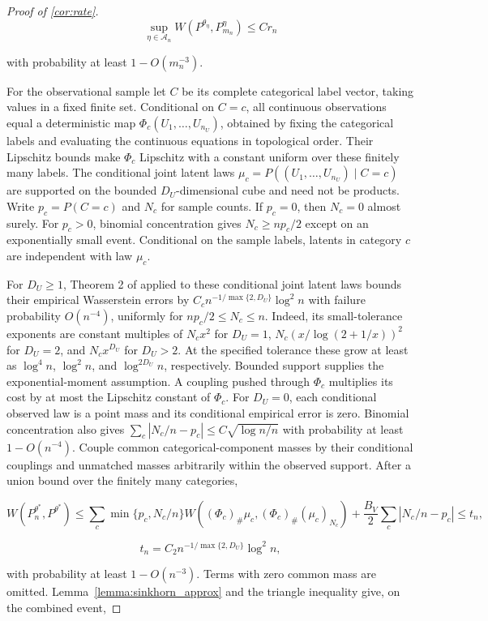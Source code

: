 \begin{proof}[Proof of \cref{cor:rate}]
\[
\sup_{\eta\in\mathcal A_n}W(P^{\theta_\eta},P_{m_n}^\eta)\leqslant Cr_n
\]

with probability at least $1-O(m_n^{-3})$. 

For the observational sample let $C$ be its complete categorical label vector, taking values in a fixed finite set. Conditional on $C=c$, all continuous observations equal a deterministic map $\Phi_c(U_1,\ldots,U_{n_U})$, obtained by fixing the categorical labels and evaluating the continuous equations in topological order. Their Lipschitz bounds make $\Phi_c$ Lipschitz with a constant uniform over these finitely many labels. The conditional joint latent laws $\mu_c=P((U_1,\ldots,U_{n_U})\mid C=c)$ are supported on the bounded $D_U$-dimensional cube and need not be products. Write $p_c=P(C=c)$ and $N_c$ for sample counts. If $p_c=0$, then $N_c=0$ almost surely. For $p_c>0$, binomial concentration gives $N_c\geqslant np_c/2$ except on an exponentially small event. Conditional on the sample labels, latents in category $c$ are independent with law $\mu_c$. 

For $D_U\geqslant1$, Theorem 2 of \cite{fournier2015rate} applied to these conditional joint latent laws bounds their empirical Wasserstein errors by $C_cn^{-1/\max\{2,D_U\}}\log^2n$ with failure probability $O(n^{-4})$, uniformly for $np_c/2\leqslant N_c\leqslant n$. Indeed, its small-tolerance exponents are constant multiples of $N_cx^2$ for $D_U=1$, $N_c(x/\log(2+1/x))^2$ for $D_U=2$, and $N_cx^{D_U}$ for $D_U>2$. At the specified tolerance these grow at least as $\log^4n$, $\log^2n$, and $\log^{2D_U}n$, respectively. Bounded support supplies the exponential-moment assumption. A coupling pushed through $\Phi_c$ multiplies its cost by at most the Lipschitz constant of $\Phi_c$. For $D_U=0$, each conditional observed law is a point mass and its conditional empirical error is zero. Binomial concentration also gives $\sum_c|N_c/n-p_c|\leqslant C\sqrt{\log n/n}$ with probability at least $1-O(n^{-4})$. Couple common categorical-component masses by their conditional couplings and unmatched masses arbitrarily within the observed support. After a union bound over the finitely many categories,

\[
W(P_n^{\theta^*},P^{\theta^*})\leqslant\sum_c\min\{p_c,N_c/n\}W((\Phi_c)_\#\mu_c,(\Phi_c)_\#(\mu_c)_{N_c})+\frac{B_V}{2}\sum_c|N_c/n-p_c|\leqslant t_n,
\]

\[
t_n=C_2n^{-1/\max\{2,D_U\}}\log^2n,
\]

with probability at least $1-O(n^{-3})$. Terms with zero common mass are omitted. Lemma~\ref{lemma:sinkhorn_approx} and the triangle inequality give, on the combined event,


\end{proof}
